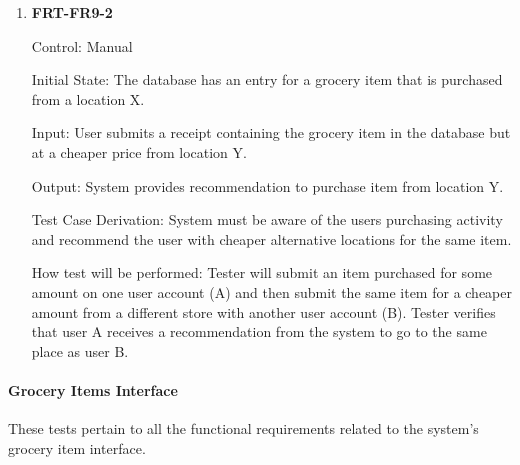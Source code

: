\documentclass[12pt, titlepage]{article}
\begin{document}
\begin{enumerate}
\item{\textbf{FRT-FR9-2}}

Control: Manual
          
Initial State: The database has an entry for a grocery item that is purchased from a location X.

Input: User submits a receipt containing the grocery item in the database but at a cheaper price from location Y.
          
Output: System provides recommendation to purchase item from location Y.

Test Case Derivation: System must be aware of the users purchasing activity and recommend the user with cheaper alternative locations for
the same item.
          
How test will be performed: Tester will submit an item purchased for some amount on one user account (A) and then submit the same item for a cheaper amount from a different store with another user account (B). Tester verifies that user A receives a recommendation from the system to go to the same place as user B.

\end{enumerate}

\paragraph{Grocery Items Interface}

These tests pertain to all the functional requirements related to the system's grocery item interface.
\end{document}
